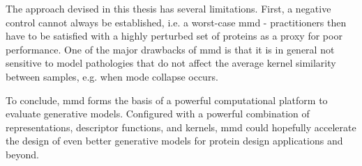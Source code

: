 The approach devised in this thesis has several limitations. First, a negative
control cannot always be established, i.e. a worst-case \gls{mmd} - practitioners then
have to be satisfied with a highly perturbed set of proteins as a proxy for poor
performance. One of the major drawbacks of \gls{mmd} is that it is in general not
sensitive to model pathologies that do not affect the average kernel similarity
between samples, e.g. when mode collapse occurs.

To conclude, \gls{mmd} forms the basis of a powerful computational platform to
evaluate generative models. Configured with a powerful combination of
representations, descriptor functions, and kernels, \gls{mmd} could hopefully
accelerate the design of even better generative models for protein design
applications and beyond.
